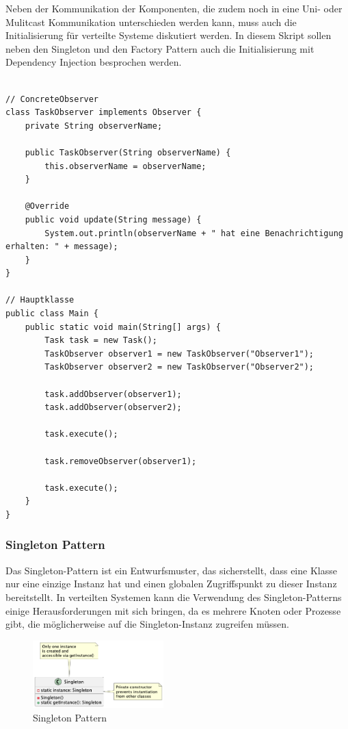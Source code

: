 \documentclass[../vs-script-first-v01.tex]{subfiles}
\begin{document}
Neben der Kommunikation der Komponenten, die zudem noch in eine Uni- oder Mulitcast Kommunikation unterschieden werden kann, muss auch die Initialisierung für verteilte Systeme diskutiert werden. In diesem Skript sollen neben den Singleton und den Factory Pattern auch die Initialisierung mit Dependency Injection besprochen werden.\\\\
\begin{minipage}{\textwidth}
\begin{lstlisting}[caption={Observer Pattern - Concrete Observer},captionpos=b,label={lst:observer-II}]
// ConcreteObserver
class TaskObserver implements Observer {
    private String observerName;

    public TaskObserver(String observerName) {
        this.observerName = observerName;
    }

    @Override
    public void update(String message) {
        System.out.println(observerName + " hat eine Benachrichtigung erhalten: " + message);
    }
}

// Hauptklasse
public class Main {
    public static void main(String[] args) {
        Task task = new Task();
        TaskObserver observer1 = new TaskObserver("Observer1");
        TaskObserver observer2 = new TaskObserver("Observer2");

        task.addObserver(observer1);
        task.addObserver(observer2);

        task.execute();

        task.removeObserver(observer1);

        task.execute();
    }
}
\end{lstlisting}
\end{minipage}

\subsubsection{Singleton Pattern}

Das Singleton-Pattern ist ein Entwurfsmuster, das sicherstellt, dass eine Klasse nur eine einzige Instanz hat und einen globalen Zugriffspunkt zu dieser Instanz bereitstellt. In verteilten Systemen kann die Verwendung des Singleton-Patterns einige Herausforderungen mit sich bringen, da es mehrere Knoten oder Prozesse gibt, die möglicherweise auf die Singleton-Instanz zugreifen müssen.
\begin{figure}[!ht]
  \centering
  \includegraphics[width=0.45\textwidth]{fig/uml/singleton.png}
  \caption{Singleton Pattern}
  \label{fig:singleton}
\end{figure}
\end{document}
